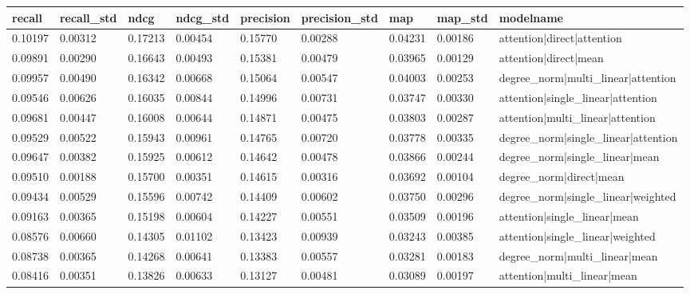 \documentclass{article}
\begin{document}
\begin{table}
\centering
\begin{tabular}{lllllllll}
\hline
recall  & recall\_std & ndcg    & ndcg\_std & precision & precision\_std & map     & map\_std & modelname                             \\ \hline
0.10197 & 0.00312     & 0.17213 & 0.00454   & 0.15770   & 0.00288        & 0.04231 & 0.00186  & attention|direct|attention            \\ \hline
0.09891 & 0.00290     & 0.16643 & 0.00493   & 0.15381   & 0.00479        & 0.03965 & 0.00129  & attention|direct|mean                 \\ \hline
0.09957 & 0.00490     & 0.16342 & 0.00668   & 0.15064   & 0.00547        & 0.04003 & 0.00253  & degree\_norm|multi\_linear|attention  \\ \hline
0.09546 & 0.00626     & 0.16035 & 0.00844   & 0.14996   & 0.00731        & 0.03747 & 0.00330  & attention|single\_linear|attention    \\ \hline
0.09681 & 0.00447     & 0.16008 & 0.00644   & 0.14871   & 0.00475        & 0.03803 & 0.00287  & attention|multi\_linear|attention     \\ \hline
0.09529 & 0.00522     & 0.15943 & 0.00961   & 0.14765   & 0.00720        & 0.03778 & 0.00335  & degree\_norm|single\_linear|attention \\ \hline
0.09647 & 0.00382     & 0.15925 & 0.00612   & 0.14642   & 0.00478        & 0.03866 & 0.00244  & degree\_norm|single\_linear|mean      \\ \hline
0.09510 & 0.00188     & 0.15700 & 0.00351   & 0.14615   & 0.00316        & 0.03692 & 0.00104  & degree\_norm|direct|mean              \\ \hline
0.09434 & 0.00529     & 0.15596 & 0.00742   & 0.14409   & 0.00602        & 0.03750 & 0.00296  & degree\_norm|single\_linear|weighted  \\ \hline
0.09163 & 0.00365     & 0.15198 & 0.00604   & 0.14227   & 0.00551        & 0.03509 & 0.00196  & attention|single\_linear|mean         \\ \hline
0.08576 & 0.00660     & 0.14305 & 0.01102   & 0.13423   & 0.00939        & 0.03243 & 0.00385  & attention|single\_linear|weighted     \\ \hline
0.08738 & 0.00365     & 0.14268 & 0.00641   & 0.13383   & 0.00557        & 0.03281 & 0.00183  & degree\_norm|multi\_linear|mean       \\ \hline
0.08416 & 0.00351     & 0.13826 & 0.00633   & 0.13127   & 0.00481        & 0.03089 & 0.00197  & attention|multi\_linear|mean          \\ \hline

\end{tabular}
\end{table}
\end{document}
